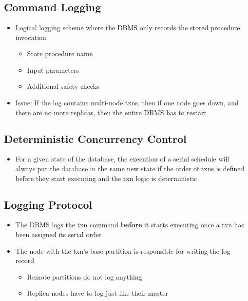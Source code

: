 \documentclass[11pt]{article}
\begin{document}
\section{}
    \subsection{Command Logging ~\cite{malviya-icde14}}
    \begin{itemize}
        \item Logical logging scheme where the DBMS only records the stored procedure invocation
            \begin{itemize}
                \item Store procedure name
                \item Input parameters
                \item Additional safety checks
            \end{itemize}
        \item Issue: If the log contains multi-node txns, then if one node goes down, and there are no more replicas, then the entire DBMS has to restart
    \end{itemize}

    \subsection*{Deterministic Concurrency Control}
    \begin{itemize}
        \item For a given state of the database, the execution of a serial schedule will always put the database in the same new state if the order of txns is defined before they start executing and the txn logic is deterministic
    \end{itemize}

    \subsection*{Logging Protocol}
    \begin{itemize}
        \item The DBMS logs the txn command \textbf{before} it starts executing once a txn has been assigned its serial order
        \item The node with the txn's base partition is responsible for writing the log record
        \begin{itemize}
            \item Remote partitions do not log anything
            \item Replica nodes have to log just like their master
        \end{itemize}
    \end{itemize}
\end{document}

